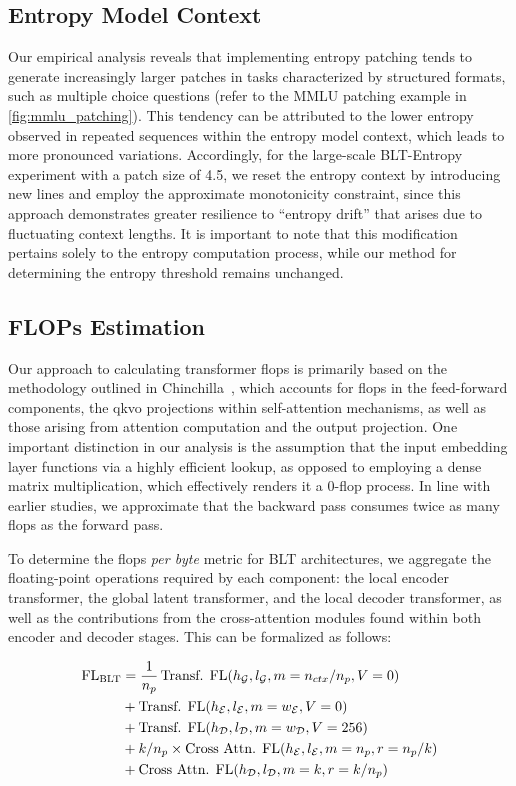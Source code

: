 \subsection{Entropy Model Context}
\label{section:entropy-context}
Our empirical analysis reveals that implementing entropy patching tends to generate increasingly larger patches in tasks characterized by structured formats, such as multiple choice questions (refer to the MMLU patching example in \autoref{fig:mmlu_patching}). This tendency can be attributed to the lower entropy observed in repeated sequences within the entropy model context, which leads to more pronounced variations. Accordingly, for the large-scale {\textsc BLT}-Entropy experiment with a patch size of 4.5, we reset the entropy context by introducing new lines and employ the approximate monotonicity constraint, since this approach demonstrates greater resilience to “entropy drift” that arises due to fluctuating context lengths. It is important to note that this modification pertains solely to the entropy computation process, while our method for determining the entropy threshold remains unchanged.

\subsection{FLOPs Estimation} 
\label{section:flops}

Our approach to calculating transformer flops is primarily based on the methodology outlined in Chinchilla~\citep{hoffmann2022training}, which accounts for flops in the feed-forward components, the qkvo projections within self-attention mechanisms, as well as those arising from attention computation and the output projection. One important distinction in our analysis is the assumption that the input embedding layer functions via a highly efficient lookup, as opposed to employing a dense matrix multiplication, which effectively renders it a 0-flop process. In line with earlier studies, we approximate that the backward pass consumes twice as many flops as the forward pass.

To determine the flops \textit{per byte} metric for {\textsc BLT} architectures, we aggregate the floating-point operations required by each component: the local encoder transformer, the global latent transformer, and the local decoder transformer, as well as the contributions from the cross-attention modules found within both encoder and decoder stages. This can be formalized as follows:

\begin{align}
    \text{FL}_{\text{{\textsc BLT}}} &= \frac{1}{n_p}\, \text{Transf. FL}(h_{\mathcal{G}}, l_{\mathcal{G}}, m=n_{ctx}/n_p,V=0) \\
   &+ \text{Transf. FL}(h_{\mathcal{E}}, l_{\mathcal{E}}, m=w_{\mathcal{E}}, V=0) \\
   &+ \text{Transf. FL}(h_{\mathcal{D}}, l_{\mathcal{D}}, m=w_{\mathcal{D}}, V=256) \\ 
    &+ k/n_p \times \text{Cross Attn. FL}(h_{\mathcal{E}}, l_{\mathcal{E}}, m=n_p, r=n_p/k) \\ 
   &+ \text{Cross Attn. FL}(h_{\mathcal{D}}, l_{\mathcal{D}}, m=k, r=k/n_p) 
\end{align}

